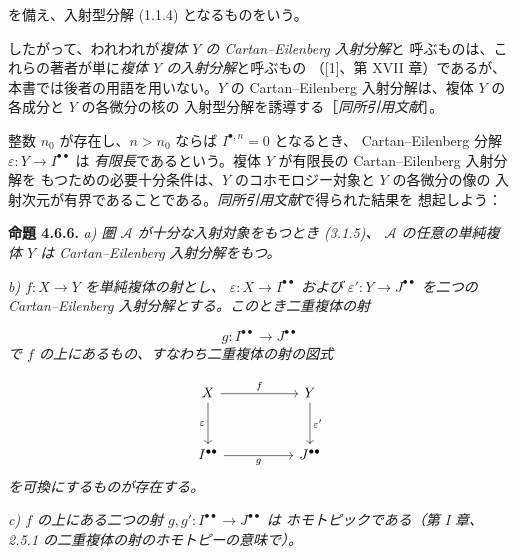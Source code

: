 \clearpage
{}%
\begingroup\small\setlength{\parskip}{0pt}\setlength{\emergencystretch}{1.5em}
\setlength{\abovedisplayskip}{4pt plus 2pt minus 2pt}%
\setlength{\belowdisplayskip}{4pt plus 2pt minus 2pt}%

\noindent を備え、入射型分解 (1.1.4) となるものをいう。

したがって、われわれが\emph{複体 $Y$ の Cartan--Eilenberg 入射分解}と
呼ぶものは、これらの著者が単に\emph{複体 $Y$ の入射分解}と呼ぶもの
（[1]、第 XVII 章）であるが、本書では後者の用語を用いない。$Y$ の
Cartan--Eilenberg 入射分解は、複体 $Y$ の各成分と $Y$ の各微分の核の
入射型分解を誘導する［\emph{同所引用文献}］。

整数 $n_0$ が存在し、$n>n_0$ ならば $I^{\bullet,n}=0$ となるとき、
Cartan--Eilenberg 分解
$\varepsilon\colon Y\longrightarrow I^{\bullet\bullet}$ は
\emph{有限長}であるという。複体 $Y$ が有限長の Cartan--Eilenberg 入射分解を
もつための必要十分条件は、$Y$ のコホモロジー対象と $Y$ の各微分の像の
入射次元が有界であることである。\emph{同所引用文献}で得られた結果を
想起しよう：

\medskip\noindent\textbf{命題 4.6.6.}\quad
\textit{a) 圏 $\mathcal A$ が十分な入射対象をもつとき (3.1.5)、
$\mathcal A$ の任意の単純複体 $Y$ は Cartan--Eilenberg 入射分解をもつ。}

\noindent\textit{b)
$f\colon X\longrightarrow Y$ を単純複体の射とし、
$\varepsilon\colon X\longrightarrow I^{\bullet\bullet}$ および
$\varepsilon'\colon Y\longrightarrow J^{\bullet\bullet}$ を二つの
Cartan--Eilenberg 入射分解とする。このとき二重複体の射}

\[
\textit{$g\colon I^{\bullet\bullet}\longrightarrow J^{\bullet\bullet}$}
\]
\textit{で $f$ の上にあるもの、すなわち二重複体の射の図式}

\[
\begin{tikzcd}[column sep=5.0em,row sep=3.0em]
X \arrow[r,"f"] \arrow[d,"\varepsilon"'] &
Y \arrow[d,"\varepsilon'"] \\
I^{\bullet\bullet} \arrow[r,"g"'] &
J^{\bullet\bullet}
\end{tikzcd}
\]
\textit{を可換にするものが存在する。}

\noindent\textit{c) $f$ の上にある二つの射
$g,g'\colon I^{\bullet\bullet}\longrightarrow J^{\bullet\bullet}$ は
ホモトピックである（第 I 章、2.5.1 の二重複体の射のホモトピーの意味で）。}


